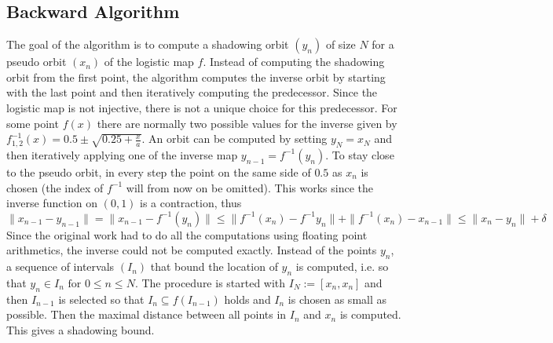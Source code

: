   \subsection{Backward Algorithm}
    The goal of the algorithm is to compute a shadowing orbit $(y_n)$ of size $N$ for a pseudo orbit $(x_n)$ of the logistic map $f$.
    Instead of computing the shadowing orbit from the first point, the algorithm computes the inverse orbit by starting with the last point and then iteratively computing the predecessor. 
    Since the logistic map is not injective, there is not a unique choice for this predecessor. 
    For some point $f(x)$ there are normally two possible values for the inverse given by $f^{-1}_{1,2}(x) = 0.5 \pm \sqrt{0.25 + \frac{x}{a}} $.
    An orbit can be computed by setting $y_N = x_N$ and then iteratively applying one of the inverse map $y_{n-1} = f^{-1}(y_n)$.   To stay close to the pseudo orbit, in every step the point on the same side of $0.5$ as $x_n$ is chosen (the index of $f^{-1}$ will from now on be omitted). 
    This works since the inverse function on $(0,1)$ is a contraction, thus
    $$ \| x_{n-1} - y_{n-1} \| = \| x_{n-1} - f^{-1}(y_n) \| \leq \| f^{-1}(x_n) - f^{-1}{y_n} \| + \| f^{-1}(x_n) - x_{n-1} \| \leq \| x_n - y_n \| + \delta $$   
    Since the original work had to do all the computations using floating point arithmetics, the inverse could not be computed exactly.
    Instead of the points $y_n$, a sequence of intervals $(I_n)$ that bound the location of $y_n$ is computed, i.e. so that $y_n \in I_n \text{ for } 0 \leq n \leq N$.
    The procedure is started with $I_N := [x_n, x_n]$ and then $I_{n-1}$ is selected so that $I_n \subseteq f(I_{n-1})$ holds and $I_n$ is chosen as small as possible. 
    Then the maximal distance between all points in $I_n$ and $x_n$ is computed.
    This gives a shadowing bound.
